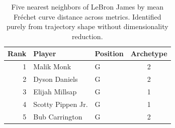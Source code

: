 \begin{table}[htbp]
  \centering\small
  \begin{tabular}{rllc}
    \toprule
    Rank & Player & Position & Archetype \\
    \midrule
    1 & Malik Monk & G & 2 \\
    2 & Dyson Daniels & G & 2 \\
    3 & Elijah Millsap & G & 1 \\
    4 & Scotty Pippen Jr. & G & 1 \\
    5 & Bub Carrington & G & 2 \\
    \bottomrule
  \end{tabular}
  \caption{Five nearest neighbors of LeBron James by mean Fr\'{e}chet curve distance across metrics. Identified purely from trajectory shape without dimensionality reduction.}
  \label{tab:LeBron_James_frechet_curve_neighbors}
\end{table}

